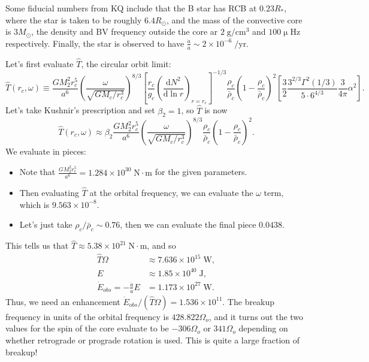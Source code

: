 \documentclass[11pt,
        usenames, %
        dvipsnames %
    ]{article}
\newcommand*{\scinot}[2]{#1\times10^{#2}}
\newcommand*{\rd}[2]{\frac{\mathrm{d}#1}{\mathrm{d}#2}}
\newcommand*{\p}[1]{\left(#1\right)}
\newcommand*{\s}[1]{\left[#1\right]}
\begin{document}
Some fiducial numbers from KQ include that the B star has RCB at $0.23R_*$,
where the star is taken to be roughly $6.4R_{\odot}$, and the mass of the
convective core is $3M_{\odot}$, the density and BV frequency outside the core
ar $2\;\mathrm{g/cm^3}$ and $100\upmu\mathrm{Hz}$ respectively. Finally, the
star is observed to have $\frac{\dot{a}}{a} \sim \scinot{2}{-6}\;\mathrm{/yr}$.

Let's first evaluate $\hat{T}$, the circular orbit limit:
\begin{equation}
    \hat{T}(r_c, \omega) \equiv \frac{GM_2^2r_c^5}{a^6}
        \p{\frac{\omega}{\sqrt{GM_c/r_c^3}}}^{8/3}
        \s{\frac{r_c}{g_c}\p{\rd{N^2}{\ln r}}_{r = r_c}}^{-1/3}
            \frac{\rho_c}{\bar{\rho}_c} \p{1 - \frac{\rho_c}{\bar{\rho}_c}}^2
            \s{\frac{3}{2}\frac{3^{2/3}\Gamma^2(1/3)}{5 \cdot
                6^{4/3}} \frac{3}{4\pi}\alpha^2}.
\end{equation}
Let's take Kushnir's prescription and set $\beta_2 = 1$, so $\hat{T}$ is now
\begin{equation}
    \hat{T}(r_c, \omega) \approx \beta_2\frac{GM_2^2r_c^5}{a^6}
        \p{\frac{\omega}{\sqrt{GM_c/r_c^3}}}^{8/3}
            \frac{\rho_c}{\bar{\rho}_c} \p{1 - \frac{\rho_c}{\bar{\rho}_c}}^2.
\end{equation}
We evaluate in pieces:
\begin{itemize}
    \item Note that $\frac{GM_2^2 r_c^5}{a^6} = \scinot{1.284}{30}\;\mathrm{N
        \cdot m}$ for the given parameters.

    \item Then evaluating $\hat{T}$ at the orbital frequency, we can evaluate
        the $\omega$ term, which is $\scinot{9.563}{-8}$.

    \item Let's just take $\rho_c / \bar{\rho}_c \sim 0.76$, then we can evaluate
        the final piece $0.0438$.
\end{itemize}
This tells us that $\hat{T} \approx \scinot{5.38}{21}\;\mathrm{N \cdot m}$, and
so
\begin{align}
    \hat{T}\Omega &\approx \scinot{7.636}{15}\;\mathrm{W},\\
    E &\approx \scinot{1.85}{40}\;\mathrm{J},\\
    \dot{E}_{obs} = -\frac{\dot{a}}{a}E &= \scinot{1.173}{27}\;\mathrm{W}.
\end{align}
Thus, we need an enhancement $\dot{E}_{obs} / \p{\hat{T}\Omega} =
\scinot{1.536}{11}$. The breakup frequency in units of the orbital frequency is
$428.822 \Omega_o$, and it turns out the two values for the spin of the core
evaluate to be $-306 \Omega_o$ or $341 \Omega_o$ depending on whether retrograde
or prograde rotation is used. This is quite a large fraction of breakup!
\end{document}
